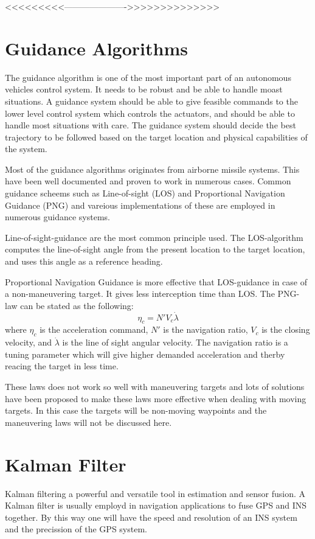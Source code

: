 	<<<<<<<<<---------------------->>>>>>>>>>>>>>

\section{Guidance Algorithms}
	The guidance algorithm is one of the most important part of an autonomous vehicles control system. It needs to be robust and be able to handle moast situations. A guidance system should be able to give feasible commands to the lower level control system which controls the actuators, and should be able to handle most situations with care. The guidance system should decide the best trajectory to be followed based on the target location and physical capabilities of the system.\cite{GuidanceReview}

	Most of the guidance algorithms originates from airborne missile systems. This have been well documented and proven to work in numerous cases. Common guidance scheems such as Line-of-sight (LOS) and Proportional Navigation Guidance (PNG) and vareious implementations of these are employed in numerous guidance systems.

	Line-of-sight-guidance are the most common principle used. The LOS-algorithm computes the line-of-sight angle from the present location to the target location, and uses this angle as a reference heading.

	Proportional Navigation Guidance is more effective that LOS-guidance in case of a non-maneuvering target. It gives less interception time than LOS. The PNG-law can be stated as the following: \cite{GuidanceReview}
	\begin{equation}
		\eta_c = N' V_c \dot{\lambda}
	\end{equation}
	where $\eta_c$ is the acceleration command, $N'$ is the navigation ratio, $V_c$ is the closing velocity, and $\dot{\lambda}$ is the line of sight angular velocity. The navigation ratio is a tuning parameter which will give higher demanded acceleration and therby reacing the target in less time.

	These laws does not work so well with maneuvering targets and lots of solutions have been proposed to make these laws more effective when dealing with moving targets. In this case the targets will be non-moving waypoints and the maneuvering laws will not be discussed here.
	
	


\section{Kalman Filter}
	Kalman filtering a powerful and versatile tool in estimation and sensor fusion. A Kalman filter is usually employd in navigation applications to fuse GPS and INS together. By this way one will have the speed and resolution of an INS system and the precission of the GPS system. 

